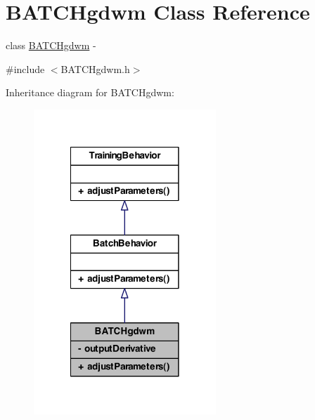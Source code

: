 \hypertarget{class_b_a_t_c_hgdwm}{
\section{BATCHgdwm Class Reference}
\label{class_b_a_t_c_hgdwm}
}


class \hyperlink{class_b_a_t_c_hgdwm}{BATCHgdwm} -\/  




{\ttfamily \#include $<$BATCHgdwm.h$>$}



Inheritance diagram for BATCHgdwm:\nopagebreak
\begin{figure}[H]
\begin{center}
\leavevmode
\includegraphics[width=194pt]{class_b_a_t_c_hgdwm__inherit__graph}
\end{center}
\end{figure}



